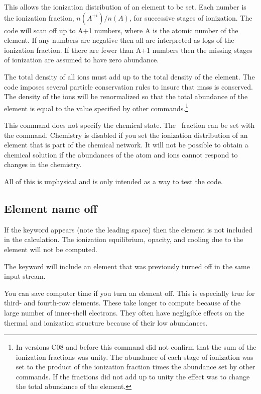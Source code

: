 This allows the ionization distribution of an element to be set.
Each
number is the ionization fraction, $n(A^{+i})/n(A)$,
for successive stages of
ionization.
The code will scan off up to A+1 numbers, where A is the atomic
number of the element.
If any numbers are negative then all are interpreted
as logs of the ionization fraction.
If there are fewer than A+1 numbers
then the missing stages of ionization are assumed to have zero abundance.

The total density of all ions must add up to the total density of the element.
The code imposes several particle conservation rules to insure that
mass is conserved.
The density of the ions will be renormalized so that the
total abundance of the element is equal to the value
specified by other commands.\footnote{In versions C08 and before this
command did not confirm that the sum of the ionization fractions
was unity.  The abundance of each stage of ionization was set to the product
of the ionization fraction times the abundance set by other commands.  If the
fractions did not add up to unity the effect was to change the total
abundance of the element.}

This command does not specify the chemical state.
The \htwo\ fraction can
be set with the  command.
Chemistry is disabled if you set the ionization distribution of an element
that is part of the chemical network.
It will not be possible to obtain
a chemical solution if the abundances of the atom and ions cannot respond
to changes in the chemistry.

All of this is unphysical and is only intended as a way to test the code.

\subsection{Element name off}

If the keyword  appears
(note the leading space) then the element
is not included in the calculation.
The ionization equilibrium, opacity,
and cooling due to the element will not be computed.

The keyword  will include an element that was
previously turned off in the same input stream.

You can save computer time if you turn an element off.
This is especially
true for third- and fourth-row elements.
These take longer to compute
because of the large number of inner-shell electrons.
They often have
negligible effects on the thermal and ionization structure because of
their low abundances.


